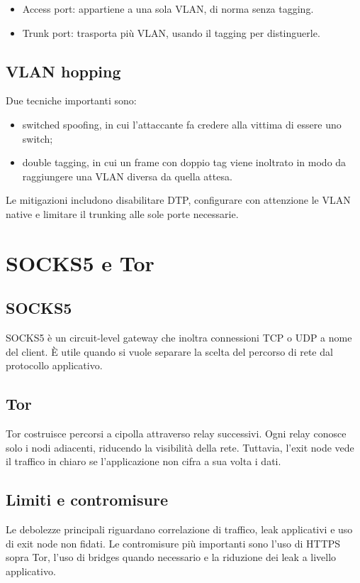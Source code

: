 \documentclass[12pt, a4paper]{report}
\begin{document}
\begin{itemize}
	\item Access port: appartiene a una sola VLAN, di norma senza tagging.
	\item Trunk port: trasporta pi\`u VLAN, usando il tagging per distinguerle.
\end{itemize}

\subsection{VLAN hopping}
Due tecniche importanti sono:
\begin{itemize}
	\item switched spoofing, in cui l'attaccante fa credere alla vittima di essere uno switch;
	\item double tagging, in cui un frame con doppio tag viene inoltrato in modo da raggiungere una VLAN diversa da quella attesa.
\end{itemize}
Le mitigazioni includono disabilitare DTP, configurare con attenzione le VLAN native e limitare il trunking alle sole porte necessarie.

\section{SOCKS5 e Tor}

\subsection{SOCKS5}
SOCKS5 \`e un circuit-level gateway che inoltra connessioni TCP o UDP a nome del client. \`E utile quando si vuole separare la scelta del percorso di rete dal protocollo applicativo.

\subsection{Tor}
Tor costruisce percorsi a cipolla attraverso relay successivi. Ogni relay conosce solo i nodi adiacenti, riducendo la visibilit\`a della rete. Tuttavia, l'exit node vede il traffico in chiaro se l'applicazione non cifra a sua volta i dati.

\subsection{Limiti e contromisure}
Le debolezze principali riguardano correlazione di traffico, leak applicativi e uso di exit node non fidati. Le contromisure pi\`u importanti sono l'uso di HTTPS sopra Tor, l'uso di bridges quando necessario e la riduzione dei leak a livello applicativo.
\end{document}

